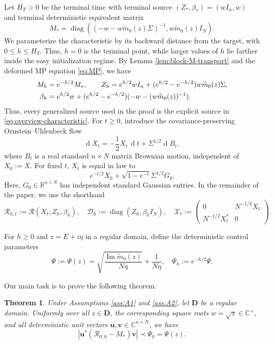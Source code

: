 \documentclass[11pt,reqno]{amsart}
\def\R{\mathbb{R}}
\def\u{\mathbf{u}}
\def\bv{\mathbf{v}}
\def\C{\mathbb{C}}
\def\cX{\mathcal{X}}
\def\cR{\mathcal{R}}
\def\cD{\mathcal{D}}
\def\bD{\mathbf{D}}
\def\de{\operatorname{d}}
\def\Im{\operatorname{Im}}
\def\diag{\operatorname{diag}}
\newtheorem{theorem}{Theorem}[section]
\theoremstyle{definition}
\numberwithin{equation}{section}
\numberwithin{figure}{section}
\begin{document}
Let $H_T>0$ be the terminal time with terminal source $(Z_*,\beta_*)=(wI_n,w)$ and terminal deterministic equivalent matrix
\[
    M_*=\diag((-w-w\widetilde m_0(z)\Sigma)^{-1},w\widetilde{m}_0(z)I_N).
\]
We parameterize the characteristic by its backward distance from the target, with $0\leq h\leq H_T$. Thus, $h=0$ is the terminal point, while larger values of $h$ lie farther inside the easy initialization regime. By Lemma \ref{lem:block-M-transport} and the deformed MP equation \eqref{eq:MP}, we have
\begin{align}
 M_{h}&=e^{-h/2}M_*,\qquad  Z_{h}=e^{h/2}wI_n+(e^{h/2}-e^{-h/2})w\widetilde{m}_0(z)\Sigma,
 \label{eq:overview-characteristic}\\
 \beta_{h}&=e^{h/2}w+(e^{h/2}-e^{-h/2})(-w-(w\widetilde m_0(z))^{-1}).
 \notag
\end{align}
Thus, every generalized source used in the proof is the explicit source
in \eqref{eq:overview-characteristic}. For $t\geq 0$, introduce the covariance-preserving Ornstein--Uhlenbeck flow
\begin{equation}
 \de X_t=-\frac12X_t\,\de t+\Sigma^{1/2}\de B_t,
 \label{eq:overview-OU}
\end{equation}
where $B_t$ is a real standard $n\times N$ matrix Brownian motion,
independent of $X_0:=X$. For fixed $t$, $X_t$ is equal in law to
\[
 e^{-t/2}X_0+\sqrt{1-e^{-t}}\Sigma^{1/2}G_0.
\]
Here, $G_0\in\R^{n\times N}$ has independent standard Gaussian entries. In the remainder of the paper, we use the shorthand
\begin{equation}\label{eq:general-resolvent}
    \cR_{h,t}:=\cR(X_t,Z_{h},\beta_{h }),\quad \cD_h:=\diag(Z_h,\beta_hI_N),\quad \cX_t:=\begin{pmatrix}
        0 & N^{-1/2}X_t\\
        N^{-1/2}X_t^* & 0
    \end{pmatrix}.
\end{equation}

For $h\geq 0$ and $z=E+i\eta$ in a regular domain, define the deterministic control parameters
\[
    \Psi:=\Psi(z)=\sqrt{\frac{\Im\widetilde{m}_0(z)}{N\eta}}+\frac{1}{N\eta},\quad \Psi_h:=e^{-h/2}\Psi.
\]

Our main task is to prove the following theorem.
\begin{theorem}\label{thm:generalized-local-law}
Under Assumptions \ref{ass:A1} and \ref{ass:A2}, let $\bD$ be a regular domain. Uniformly over all $z\in\bD$, the corresponding square roots $w=\sqrt{z}\in\C^+$, and all deterministic unit vectors $\u,\bv\in\C^{n+N}$, we have
\[
    |\u^*(\cR_{0,0}-M_*)\bv|\prec\Psi_0=\Psi(z).
\]
\end{theorem}
\end{document}
